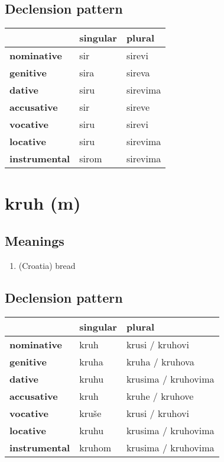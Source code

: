 \subsection*{Declension pattern}
\begin{tabularx}{\linewidth}{Xll}
\toprule
{} & singular &    plural \\
\midrule
\textbf{nominative  } &      sir &    sirevi \\
\textbf{genitive    } &     sira &    sireva \\
\textbf{dative      } &     siru &  sirevima \\
\textbf{accusative  } &      sir &    sireve \\
\textbf{vocative    } &     siru &    sirevi \\
\textbf{locative    } &     siru &  sirevima \\
\textbf{instrumental} &    sirom &  sirevima \\
\bottomrule
\end{tabularx}

\filbreak
\section{kruh (m)}
\subsection*{Meanings}
\begin{enumerate}
\item (Croatia) bread
\end{enumerate}
\subsection*{Declension pattern}
\begin{tabularx}{\linewidth}{Xll}
\toprule
{} & singular &               plural \\
\midrule
\textbf{nominative  } &     kruh &      krusi / kruhovi \\
\textbf{genitive    } &    kruha &      kruha / kruhova \\
\textbf{dative      } &    kruhu &  krusima / kruhovima \\
\textbf{accusative  } &     kruh &      kruhe / kruhove \\
\textbf{vocative    } &    kruše &      krusi / kruhovi \\
\textbf{locative    } &    kruhu &  krusima / kruhovima \\
\textbf{instrumental} &   kruhom &  krusima / kruhovima \\
\bottomrule
\end{tabularx}

